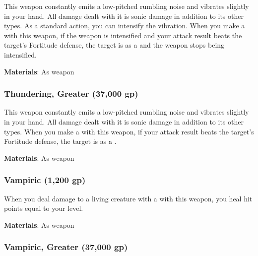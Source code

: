 This weapon constantly emits a low-pitched rumbling noise and vibrates slightly in your hand.
All damage dealt with it is sonic damage in addition to its other types.
As a standard action, you can intensify the vibration.
When you make a  with this weapon, if the weapon is intensified and your attack result beats the target's Fortitude defense,
the target is \deafened as a  and the weapon stops being intensified.



\vspace{0.25em}
\textbf{Materials}: As weapon


\lowercase{\hypertarget{item:Thundering, Greater}{}}\label{item:Thundering, Greater}
\hypertarget{item:Thundering, Greater}{\subsubsection{Thundering, Greater\hfill{} (37,000 gp)}}

This weapon constantly emits a low-pitched rumbling noise and vibrates slightly in your hand.
All damage dealt with it is sonic damage in addition to its other types.
When you make a  with this weapon, if your attack result beats the target's Fortitude defense, the target is \deafened as a .



\vspace{0.25em}
\textbf{Materials}: As weapon


\lowercase{\hypertarget{item:Vampiric}{}}\label{item:Vampiric}
\hypertarget{item:Vampiric}{\subsubsection{Vampiric\hfill{} (1,200 gp)}}

When you deal damage to a living creature with a  with this weapon, you heal hit points equal to your level.



\vspace{0.25em}
\textbf{Materials}: As weapon


\lowercase{\hypertarget{item:Vampiric, Greater}{}}\label{item:Vampiric, Greater}
\hypertarget{item:Vampiric, Greater}{\subsubsection{Vampiric, Greater\hfill{} (37,000 gp)}}

